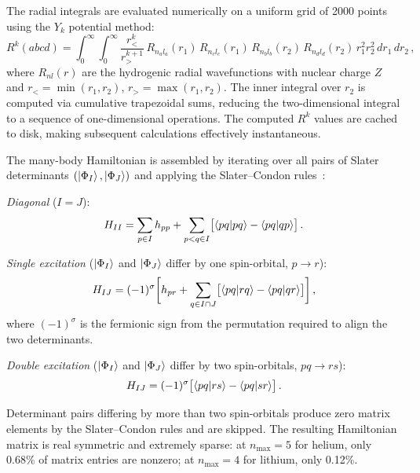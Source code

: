 \documentclass[aps,pra,twocolumn,superscriptaddress,longbibliography,floatfix]{revtex4-2}
\begin{document}
The radial integrals are evaluated numerically on a uniform grid
of 2000 points using the $Y_k$ potential method:
\begin{equation}
R^k(abcd) = \int_0^{\infty} \int_0^{\infty}
\frac{r_<^k}{r_>^{k+1}}\,
R_{n_a l_a}(r_1)\, R_{n_c l_c}(r_1)\,
R_{n_b l_b}(r_2)\, R_{n_d l_d}(r_2)\,
r_1^2 r_2^2\, dr_1\, dr_2\,,
\label{eq:rk}
\end{equation}
where $R_{nl}(r)$ are the hydrogenic radial wavefunctions with
nuclear charge $Z$ and $r_< = \min(r_1, r_2)$,
$r_> = \max(r_1, r_2)$.
The inner integral over $r_2$ is computed via cumulative trapezoidal
sums, reducing the two-dimensional integral to a sequence of
one-dimensional operations.
The computed $R^k$ values are cached to disk, making subsequent
calculations effectively instantaneous.

The many-body Hamiltonian is assembled by iterating over all pairs
of Slater determinants $(\ket{\Phi_I}, \ket{\Phi_J})$ and applying
the Slater--Condon rules~\cite{Szabo1996}:

\emph{Diagonal} ($I = J$):
\begin{equation}
H_{II} = \sum_{p \in I} h_{pp}
+ \sum_{p < q \in I} \bigl[\braket{pq|pq} - \braket{pq|qp}\bigr]\,.
\label{eq:sc_diag}
\end{equation}

\emph{Single excitation} ($\ket{\Phi_I}$ and $\ket{\Phi_J}$ differ
by one spin-orbital, $p \to r$):
\begin{equation}
H_{IJ} = (-1)^{\sigma} \biggl[ h_{pr}
+ \sum_{q \in I \cap J} \bigl[\braket{pq|rq} - \braket{pq|qr}\bigr]
\biggr]\,,
\label{eq:sc_single}
\end{equation}
where $(-1)^{\sigma}$ is the fermionic sign from the permutation
required to align the two determinants.

\emph{Double excitation} ($\ket{\Phi_I}$ and $\ket{\Phi_J}$ differ
by two spin-orbitals, $pq \to rs$):
\begin{equation}
H_{IJ} = (-1)^{\sigma}
\bigl[\braket{pq|rs} - \braket{pq|sr}\bigr]\,.
\label{eq:sc_double}
\end{equation}

Determinant pairs differing by more than two spin-orbitals produce
zero matrix elements by the Slater--Condon rules and are skipped.
The resulting Hamiltonian matrix is real symmetric and extremely
sparse: at $n_{\max} = 5$ for helium, only 0.68\% of matrix entries
are nonzero; at $n_{\max} = 4$ for lithium, only 0.12\%.

\end{document}
